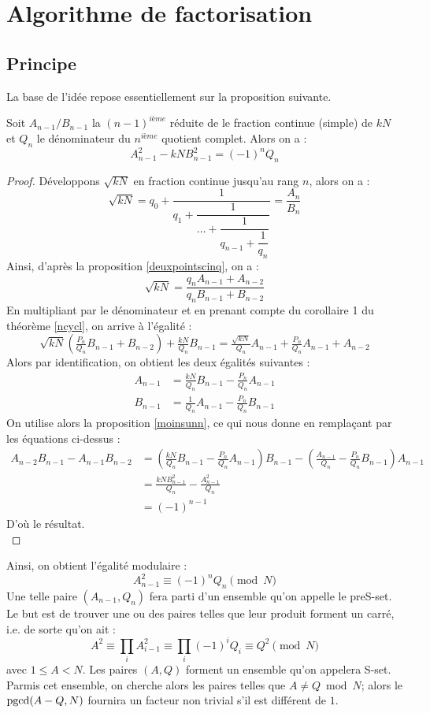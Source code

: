 \documentclass[a4paper]{article} %
\numberwithin{equation}{section}
\begin{document}
\section{Algorithme de factorisation}
\subsection{Principe}
La base de l'idée repose essentiellement sur la proposition suivante.
\begin{prop}
Soit $A_{n-1}/B_{n-1}$ la $(n-1)^{\textit{ième}}$ réduite de le fraction continue (simple) de $kN$ et $Q_n$ le dénominateur du $n^{\textit{ième}}$ quotient complet. Alors on a :
\begin{equation}\label{eqalg}A_{n-1}^2 - kNB_{n-1}^2 = (-1)^nQ_n\end{equation}
\end{prop}
\begin{proof}
Développons $\sqrt{kN}$ en fraction continue jusqu'au rang $n$, alors on a :
\[\sqrt{kN}=q_0+\dfrac{1}{q_1 + \dfrac{1}{\dots + \dfrac{1}{q_{n-1} + \dfrac{1}{q_n}}}} = \dfrac{A_n}{B_n}\]
Ainsi, d'après la proposition \ref{deuxpointscinq}, on a :
\[\sqrt{kN} = \dfrac{q_nA_{n-1} + A_{n-2}}{q_nB_{n-1} + B_{n-2}}\]
En multipliant par le dénominateur et en prenant compte du corollaire 1 du théorème \ref{ncycl}, on arrive à l'égalité :
\[\sqrt{kN}(\tfrac{P_n}{Q_n}B_{n-1} + B_{n-2}) + \tfrac{kN}{Q_n}B_{n-1} = \tfrac{\sqrt{kN}}{Q_n}A_{n-1} + \tfrac{P_n}{Q_n}A_{n-1} + A_{n-2}\]
Alors par identification, on obtient les deux égalités suivantes :
\begin{align*}
A_{n-1} &=\tfrac{kN}{Q_n}B_{n-1} - \tfrac{P_n}{Q_n}A_{n-1}\\
B_{n-1} &=\tfrac{1}{Q_n}A_{n-1} - \tfrac{P_n}{Q_n}B_{n-1}
\end{align*}
On utilise alors la proposition \ref{moinsunn}, ce qui nous donne en remplaçant par les équations ci-dessus :
\begin{align*}
A_{n-2}B_{n-1}-A_{n-1}B_{n-2}&=(\tfrac{kN}{Q_n}B_{n-1}-\tfrac{P_n}{Q_n}A_{n-1})B_{n-1}-(\tfrac{A_{n-1}}{Q_n}-\tfrac{P_n}{Q_n}B_{n-1})A_{n-1}\\
&= \frac{kNB_{n-1}^2}{Q_n} - \frac{A_{n-1}^2}{Q_n}\\
&= (-1)^{n-1}
\end{align*}
D'où le résultat.\\
\end{proof}
Ainsi, on obtient l'égalité modulaire :
\[A_{n-1}^2 \equiv (-1)^nQ_n \pmod N\]
Une telle paire $(A_{n-1}, Q_n)$ fera parti d'un ensemble qu'on appelle le preS-set. Le but est de trouver une ou des paires telles que leur produit forment un carré, i.e. de sorte qu'on ait :
\[A^2 \equiv \prod_i{A_{i-1}^2} \equiv \prod_i{(-1)^iQ_i} \equiv Q^2 \pmod N\]
avec $1 \leq A < N$. Les paires $(A, Q)$ forment un ensemble qu'on appelera S-set. Parmis cet ensemble, on cherche alors les paires telles que $A \neq Q \bmod N$; alors le $\textup{pgcd}(A - Q, N)$ fournira un facteur non trivial s'il est différent de $1$.
\end{document}
